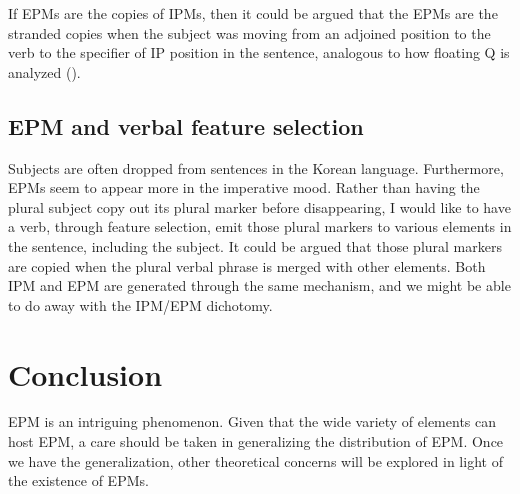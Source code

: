 \documentclass{article}
\begin{document}
If EPMs are the copies of IPMs, then it could be argued that the EPMs are the stranded copies when the subject was moving from an adjoined position to the verb to the specifier of IP position in the sentence, analogous to how floating Q is analyzed (\cite{MCC97}).

\subsection{EPM and verbal feature selection}

Subjects are often dropped from sentences in the Korean language. Furthermore, EPMs seem to appear more in the imperative mood. Rather than having the plural subject copy out its plural marker before disappearing, I would like to have a verb, through feature selection, emit those plural markers to various elements in the sentence, including the subject. It could be argued that those plural markers are copied when the plural verbal phrase is merged with other elements. Both IPM and EPM are generated through the same mechanism, and we might be able to do away with the IPM/EPM dichotomy.

\section{Conclusion}

EPM is an intriguing phenomenon. Given that the wide variety of elements can host EPM, a care should be taken in generalizing the distribution of EPM. Once we have the generalization, other theoretical concerns will be explored in light of the existence of EPMs.

\singlespacing
\medskip

\end{document}
